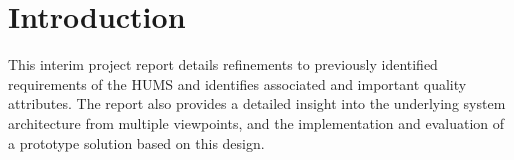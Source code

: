 \section{Introduction}
\label{sec:introduction}

This interim project report details refinements to previously identified requirements of the HUMS and identifies associated and important quality attributes. The report also provides a detailed insight into the underlying system architecture from multiple viewpoints, and the implementation and evaluation of a prototype solution based on this design.
